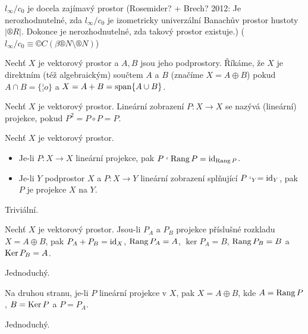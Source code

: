 \documentclass[12pt]{article}					%
\begin{document}
\begin{poznamka}[Zajímavosti]
	$l_∞ / c_0$ je docela zajímavý prostor (Rosemider? + Brech? 2012: Je nerozhodnutelné, zda $l_∞ / c_0$ je izometricky univerzální Banachův prostor hustoty $|®R|$. Dokonce je nerozhodnutelné, zda takový prostor existuje.) ($l_∞ / c_0 ≡ ©C(\beta ®N \setminus ®N)$)
\end{poznamka}

\begin{definice}
	Nechť $X$ je vektorový prostor a $A, B$ jsou jeho podprostory. Říkáme, že $X$ je direktním (též algebraickým) součtem $A$ a $B$ (značíme $X = A \oplus B$) pokud $A \cap B = \{¦o\}$ a $X = A + B = \operatorname{span}\{A \cup B\}$.
\end{definice}

\begin{definice}[Projekce]
	Nechť $X$ je vektorový prostor. Lineární zobrazení $P: X \rightarrow X$ se nazývá (lineární) projekce, pokud $P^2 = P \circ P = P$.
\end{definice}

\begin{tvrzeni}[Fakt]
	Nechť $X$ je vektorový prostor.

	\begin{itemize}
		\item Je-li $P: X \rightarrow X$ lineární projekce, pak $P\lhook{\Rang P} = \id_{\Rang P}$.
		\item Je-li $Y$ podprostor $X$ a $P: X \rightarrow Y$ lineární zobrazení splňující $P\lhook_Y = \id_Y$, pak $P$ je projekce $X$ na $Y$.
	\end{itemize}

	\begin{dukazin}
		Triviální.
	\end{dukazin}
\end{tvrzeni}

\begin{tvrzeni}
	Nechť $X$ je vektorový prostor. Jsou-li $P_A$ a $P_B$ projekce příslušné rozkladu $X = A \oplus B$, pak $P_A + P_B = \operatorname{id}_X$, $\operatorname{Rang} P_A = A$, $\ker P_A = B$, $\operatorname{Rang} P_B = B$ a $\operatorname{Ker} P_B = A$.

	\begin{dukazin}
		Jednoduchý.
	\end{dukazin}

	Na druhou stranu, je-li $P$ lineární projekce v $X$, pak $X = A \oplus B$, kde $A = \operatorname{Rang} P$, $B = \operatorname{Ker} P$ a $P = P_A$.

	\begin{dukazin}
		Jednoduchý.
	\end{dukazin}
\end{tvrzeni}
\end{document}
